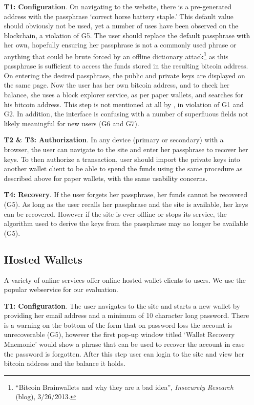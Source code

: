 \textbf{T1: Configuration}.
On navigating to the \brain website, there is a pre-generated address with the passphrase `correct horse battery staple.' This default value should obviously not be used, yet a number of uses have been observed on the blockchain, a violation of G5. The user should replace the default passphrase with her own, hopefully ensuring her passphrase is not a commonly used phrase or anything that could be brute forced by an offline dictionary attack\footnote{``Bitcoin Brainwallets and why they are a bad idea'', \textit{Insecurety Research} (blog), 3/26/2013.} as this passphrase is sufficient to access the funds stored in the resulting bitcoin address. On entering the desired passphrase, the public and private keys are displayed on the same page. Now the user has her own bitcoin address, and to check her balance, she uses  a block explorer service, as per paper wallets, and searches for his bitcoin address. This step is not mentioned at all by \brain, in violation of G1 and G2. In addition, the interface is confusing with a number of superfluous fields not likely meaningful for new users (G6 and G7).

\textbf{T2 \& T3: Authorization}.
In any device (primary or secondary) with a browser, the user can navigate to the \brain site and enter her passphrase to recover her keys. To then authorize a transaction, user should import the private keys into another wallet client to be able to spend the funds using the same procedure as described above for paper wallets, with the same usability concerns.

\textbf{T4: Recovery}.
If the user forgets her passphrase, her funds cannot be recovered (G5). As long as the user recalls her passphrase and the \brain site is available, her keys can be recovered. However if the site is ever offline or stops its service, the algorithm used to derive the keys from the passphrase may no longer be available (G5).

\subsection{Hosted Wallets}
\label{hosted}
A variety of online services offer online hosted wallet clients to users. We use the popular \block webservice for our evaluation.

\textbf{T1: Configuration}.
The user navigates to the \block site and starts a new wallet by providing her email address and a minimum of 10 character long password. There is a warning on the bottom of the form that on password loss the account is unrecoverable (G5), however the first pop-up window titled `Wallet Recovery Mnemonic' would show a phrase that can be used to recover the account in case the password is forgotten. After this step user can login to the site and view her bitcoin address and the balance it holds.

